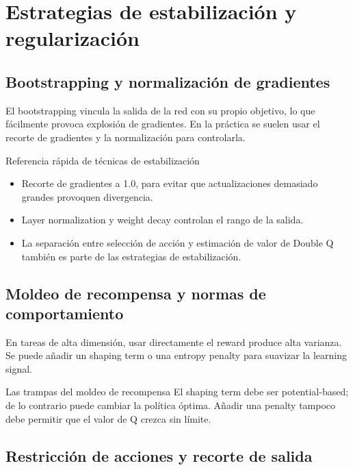 \section{Estrategias de estabilización y regularización}

\subsection{Bootstrapping y normalización de gradientes}

El bootstrapping vincula la salida de la red con su propio objetivo, lo que fácilmente provoca explosión de gradientes. En la práctica se suelen usar el recorte de gradientes y la normalización para controlarla.

\begin{importantbox}{Referencia rápida de técnicas de estabilización}
\begin{itemize}
    \item Recorte de gradientes a 1.0, para evitar que actualizaciones demasiado grandes provoquen divergencia.
    \item Layer normalization y weight decay controlan el rango de la salida.
    \item La separación entre selección de acción y estimación de valor de Double Q también es parte de las estrategias de estabilización.
\end{itemize}
\end{importantbox}

\subsection{Moldeo de recompensa y normas de comportamiento}

En tareas de alta dimensión, usar directamente el reward produce alta varianza. Se puede añadir un shaping term o una entropy penalty para suavizar la learning signal.

\begin{warningbox}{Las trampas del moldeo de recompensa}
El shaping term debe ser potential-based; de lo contrario puede cambiar la política óptima. Añadir una penalty tampoco debe permitir que el valor de Q crezca sin límite.
\end{warningbox}

\subsection{Restricción de acciones y recorte de salida}

